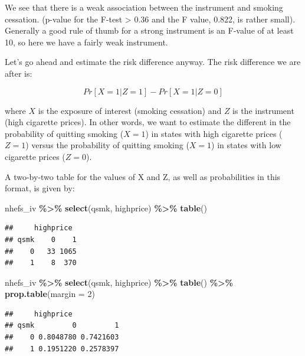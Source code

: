 \documentclass[
]{book}
\newenvironment{Shaded}{\begin{snugshade}}{\end{snugshade}}
\newcommand{\AttributeTok}[1]{\textcolor[rgb]{0.13,0.29,0.53}{#1}}
\newcommand{\DecValTok}[1]{\textcolor[rgb]{0.00,0.00,0.81}{#1}}
\newcommand{\FunctionTok}[1]{\textcolor[rgb]{0.13,0.29,0.53}{\textbf{#1}}}
\newcommand{\NormalTok}[1]{#1}
\newcommand{\SpecialCharTok}[1]{\textcolor[rgb]{0.81,0.36,0.00}{\textbf{#1}}}
\begin{document}
We see that there is a weak association between the instrument and smoking cessation. (p-value for the F-test \textgreater{} 0.36 and the F value, 0.822, is rather small). Generally a good rule of thumb for a strong instrument is an F-value of at least 10, so here we have a fairly weak instrument.

Let's go ahead and estimate the risk difference anyway. The risk difference we are after is:

\[
Pr[X=1|Z=1] -  Pr[X=1|Z=0]
\]

where \(X\) is the exposure of interest (smoking cessation) and \(Z\) is the instrument (high cigarette prices). In other words, we want to estimate the different in the probability of quitting smoking (\(X = 1\)) in states with high cigarette prices (\(Z = 1\)) versus the probability of quitting smoking (\(X = 1\)) in states with low cigarette prices (\(Z = 0\)).

A two-by-two table for the values of X and Z, as well as probabilities in this format, is given by:

\begin{Shaded}
\begin{Highlighting}[]
\NormalTok{nhefs\_iv }\SpecialCharTok{\%\textgreater{}\%} 
  \FunctionTok{select}\NormalTok{(qsmk, highprice) }\SpecialCharTok{\%\textgreater{}\%} 
  \FunctionTok{table}\NormalTok{()}
\end{Highlighting}
\end{Shaded}

\begin{verbatim}
##     highprice
## qsmk    0    1
##    0   33 1065
##    1    8  370
\end{verbatim}

\begin{Shaded}
\begin{Highlighting}[]
\NormalTok{nhefs\_iv }\SpecialCharTok{\%\textgreater{}\%} 
  \FunctionTok{select}\NormalTok{(qsmk, highprice) }\SpecialCharTok{\%\textgreater{}\%} 
  \FunctionTok{table}\NormalTok{() }\SpecialCharTok{\%\textgreater{}\%} 
  \FunctionTok{prop.table}\NormalTok{(}\AttributeTok{margin =} \DecValTok{2}\NormalTok{)}
\end{Highlighting}
\end{Shaded}

\begin{verbatim}
##     highprice
## qsmk         0         1
##    0 0.8048780 0.7421603
##    1 0.1951220 0.2578397
\end{verbatim}
\end{document}
